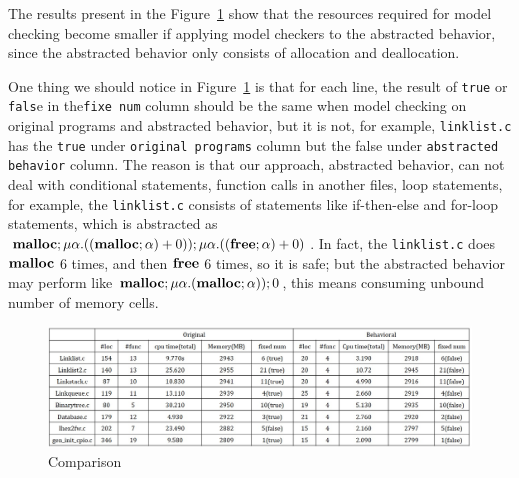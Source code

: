 The results present in the Figure~\ref{fig:statistic} show that the
resources required for model checking become smaller if applying model
checkers to the abstracted behavior, since the abstracted behavior
only consists of allocation and deallocation.

One thing we should notice in Figure~\ref{fig:statistic} is that for
each line, the result of \texttt{true} or \texttt{fals}e in
the\texttt{fixe num} column should be the same when model checking on
original programs and abstracted behavior, but it is not, for example,
\texttt{linklist.c} has the \texttt{true} under \texttt{original
  programs} column but the false under \texttt{abstracted behavior}
column. The reason is that our approach, abstracted behavior, can not
deal with conditional statements, function calls in another files,
loop statements, for example, the \texttt{linklist.c} consists of
statements like if-then-else and for-loop statements, which is
abstracted as $\mathbf{malloc};\mu\alpha.((\mathbf{malloc};\alpha) +
0));\mu\alpha.((\mathbf{free};\alpha) + 0)$. In fact, the \texttt{linklist.c}
does $\mathbf{malloc}$ 6 times, and then $\mathbf{free}$ 6 times, so it is safe; but
the abstracted behavior may perform like
$\mathbf{malloc};\mu\alpha.(\mathbf{malloc};\alpha));0$, this means consuming unbound
number of memory cells.

\begin{figure}
 \centering
 \includegraphics[width=14cm]{statistic.png}
\caption{Comparison}
\label{fig:statistic}
\end{figure}
